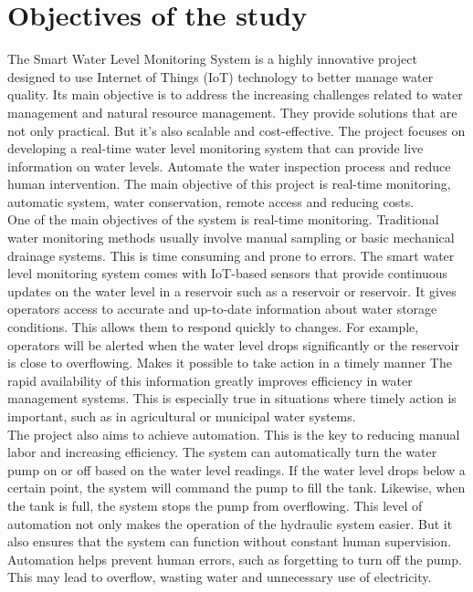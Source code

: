 \section{Objectives of the study}
{\fontsize{12}{14}\selectfont
The Smart Water Level Monitoring System is a highly innovative project designed to use Internet of Things (IoT) technology to better manage water quality. Its main objective is to address the increasing challenges related to water management and natural resource management. They provide solutions that are not only practical. But it's also scalable and cost-effective. The project focuses on developing a real-time water level monitoring system that can provide live information on water levels. Automate the water inspection process and reduce human intervention. The main objective of this project is real-time monitoring, automatic system, water conservation, remote access and reducing costs.\\

\noindent
One of the main objectives of the system is real-time monitoring. Traditional water monitoring methods usually involve manual sampling or basic mechanical drainage systems. This is time consuming and prone to errors. The smart water level monitoring system comes with IoT-based sensors that provide continuous updates on the water level in a reservoir such as a reservoir or reservoir. It gives operators access to accurate and up-to-date information about water storage conditions. This allows them to respond quickly to changes. For example, operators will be alerted when the water level drops significantly or the reservoir is close to overflowing. Makes it possible to take action in a timely manner The rapid availability of this information greatly improves efficiency in water management systems. This is especially true in situations where timely action is important, such as in agricultural or municipal water systems.\\

\noindent
The project also aims to achieve automation. This is the key to reducing manual labor and increasing efficiency. The system can automatically turn the water pump on or off based on the water level readings. If the water level drops below a certain point, the system will command the pump to fill the tank. Likewise, when the tank is full, the system stops the pump from overflowing. This level of automation not only makes the operation of the hydraulic system easier. But it also ensures that the system can function without constant human supervision. Automation helps prevent human errors, such as forgetting to turn off the pump. This may lead to overflow, wasting water and unnecessary use of electricity. \\

}
